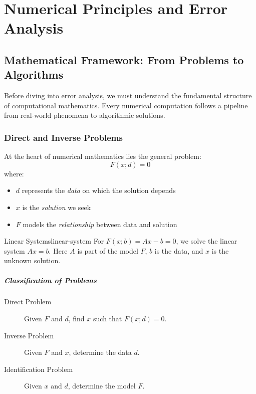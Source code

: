\chapter{Numerical Principles and Error Analysis}
\label{ch:numerical-principles}

\section{Mathematical Framework: From Problems to Algorithms}
\label{sec:framework}

Before diving into error analysis, we must understand the fundamental structure of computational mathematics. Every numerical computation follows a pipeline from real-world phenomena to algorithmic solutions.

\subsection{Direct and Inverse Problems}
\label{subsec:direct-inverse}

At the heart of numerical mathematics lies the general problem:
\begin{equation}
    \boxed{F(x; d) = 0}
    \label{eq:general-problem}
\end{equation}
where:
\begin{itemize}
    \item $d$ represents the \emph{data} on which the solution depends
    \item $x$ is the \emph{solution} we seek
    \item $F$ models the \emph{relationship} between data and solution
\end{itemize}

\begin{example}{Linear Systems}{linear-system}
    For $F(x; b) = Ax - b = 0$, we solve the linear system $Ax = b$.
    Here $A$ is part of the model $F$, $b$ is the data, and $x$ is the unknown solution.
\end{example}

\paragraph{Classification of Problems}
\begin{description}
    \item[Direct Problem] Given $F$ and $d$, find $x$ such that $F(x; d) = 0$.
    \item[Inverse Problem] Given $F$ and $x$, determine the data $d$.
    \item[Identification Problem] Given $x$ and $d$, determine the model $F$.
\end{description}

